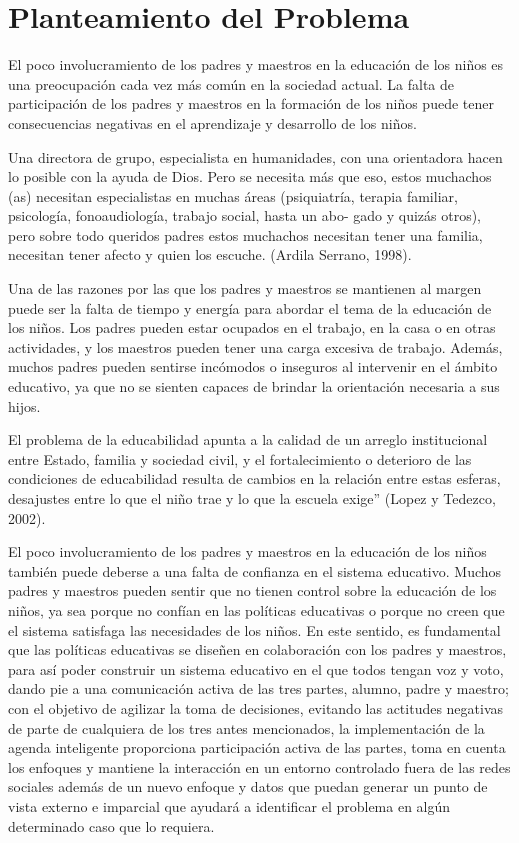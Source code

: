 \section{Planteamiento del Problema}

\hspace{2cm}El poco involucramiento de los padres y maestros en la educación de los niños es una
preocupación cada vez más común en la sociedad actual. La falta de participación de los padres y
maestros en la formación de los niños puede tener consecuencias negativas en el aprendizaje y
desarrollo de los niños.

Una directora de grupo, especialista en humanidades, con una orientadora hacen lo posible
con la ayuda de Dios. Pero se necesita más que eso, estos muchachos (as) necesitan especialistas
en muchas áreas (psiquiatría, terapia familiar, psicología, fonoaudiología, trabajo social, hasta un
abo- gado y quizás otros), pero sobre todo queridos padres estos muchachos necesitan tener una
familia, necesitan tener afecto y quien los escuche. (Ardila Serrano, 1998).

\vspace{1cm}Una de las razones por las que los padres y maestros se mantienen al margen puede ser la
falta de tiempo y energía para abordar el tema de la educación de los niños. Los padres pueden
estar ocupados en el trabajo, en la casa o en otras actividades, y los maestros pueden tener una
carga excesiva de trabajo. Además, muchos padres pueden sentirse incómodos o inseguros al
intervenir en el ámbito educativo, ya que no se sienten capaces de brindar la orientación
necesaria a sus hijos.

El problema de la educabilidad apunta a la calidad de un arreglo institucional entre Estado,
familia y sociedad civil, y el fortalecimiento o deterioro de las condiciones de educabilidad
resulta de cambios en la relación entre estas esferas, desajustes entre lo que el niño trae y lo que
la escuela exige” (Lopez y Tedezco, 2002).

El poco involucramiento de los padres y maestros en la educación de los niños también
puede deberse a una falta de confianza en el sistema educativo. Muchos padres y maestros
pueden sentir que no tienen control sobre la educación de los niños, ya sea porque no confían en
las políticas educativas o porque no creen que el sistema satisfaga las necesidades de los niños.
En este sentido, es fundamental que las políticas educativas se diseñen en colaboración con los
padres y maestros, para así poder construir un sistema educativo en el que todos tengan voz y
voto, dando pie a una comunicación activa de las tres partes, alumno, padre y maestro; con el
objetivo de agilizar la toma de decisiones, evitando las actitudes negativas de parte de cualquiera
de los tres antes mencionados, la implementación de la agenda inteligente proporciona
participación activa de las partes, toma en cuenta los enfoques y mantiene la interacción en un
entorno controlado fuera de las redes sociales además de un nuevo enfoque y datos que puedan
generar un punto de vista externo e imparcial que ayudará a identificar el problema en algún
determinado caso que lo requiera.

